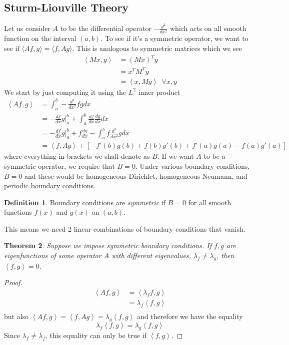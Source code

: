 \documentclass{article}
\newcommand{\od}[2]{\frac{d #1}{d #2}}
\newcommand{\odt}[2]{\frac{d^2 #1}{d #2 ^2}}
\newcommand{\ip}[2]{\left\langle #1,#2\right\rangle}
\newtheorem{theorem}{Theorem}[section]
\theoremstyle{definition}
\newtheorem{definition}[theorem]{Definition}
\begin{document}
\subsection{Sturm-Liouville Theory}
Let us consider $A$ to be the differential operator $-\odt{}{x}$ which acts on all smooth function on the interval $(a,b)$. To see if it's a symmetric operator, we want to see if $\langle Af, g\rangle = \langle f,Ag\rangle $. This is analogous to symmetric matrices which we see 
\begin{equation*}
    \begin{split}
        \ip{Mx}{y} &= (Mx)^Ty \\
        &=x^TM^Ty \\
        &=\ip{x}{My}\,\,\, \forall x,y
    \end{split}
\end{equation*}
We start by just computing it using the $L^2$ inner product
\begin{equation*}
    \begin{split}
        \ip{Af}{g}&=\int^b_a -\odt{}{x}fgdx \\
        &=-\od{f}{x}g\Bigg|^b_a +\int^b_a \od{f}{x}\od{g}{x}dx \\
        &=-\od{f}{x}g\Bigg|^b_a +f\od{g}{x} -\int^b_af \odt{}{x}gdx \\
        &=\ip{f}{Ag} + \left[-f'(b)g(b)+f(b)g'(b)+f'(a)g(a)-f(a)g'(a) \right]
    \end{split}
\end{equation*}
where everything in brackets we shall denote as $B$. If we want $A$ to be a symmetric operator, we require that $B=0$. Under various boundary conditions, $B=0$ and these would be homogeneous Dirichlet, homogeneous Neumann, and periodic boundary conditions. 
\begin{definition}
    Boundary conditions are \emph{symmetric} if $B=0$ for all smooth functions $f(x)$ and $g(x)$ on $(a,b)$.
\end{definition}
This means we need 2 linear combinations of boundary conditions that vanish. 
\begin{theorem}
    Suppose we impose symmetric boundary conditions. If $f,g$ are eigenfunctions of some operator $A$ with different eigenvalues,  $\lambda_f \neq \lambda _g$, then $\ip{f}{g} =0$.
\end{theorem}
\begin{proof}
    \begin{equation*}
        \begin{split}
            \ip{Af}{g} &=\ip{\lambda_ff}{g} \\
            &= \lambda_f \ip{f}{g}\\
        \end{split}
    \end{equation*}
    but also $\ip{Af}{g} =\ip{f}{Ag}=\lambda_g\ip{f}{g}$ and therefore we have the equality 
    \begin{equation*}
        \lambda_f \ip{f}{g} = \lambda_g\ip{f}{g}
    \end{equation*}
    Since $\lambda_f\neq \lambda_f$, this equality can only be true if $\ip{f}{g}$. 
\end{proof}
\end{document}
